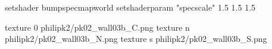 setshader bumpspecmapworld
setshaderparam "specscale" 1.5 1.5 1.5

texture 0 philipk2/pk02_wall03b_C.png
texture n philipk2/pk02_wall03b_N.png
texture s philipk2/pk02_wall03b_S.png

